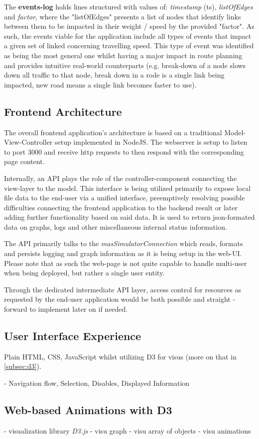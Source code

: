 The \textbf{events-log} holds lines structured with values of: \textit{timestamp} (ts), \textit{listOfEdges} and \textit{factor}, where the "listOfEdges" presents a list of nodes that identify links between them to be impacted in their weight / speed by the provided "factor".
As such, the events viable for the application include all types of events that impact a given set of linked concerning travelling speed. This type of event was identified as being the most general one whilst having a major impact in route planning and provides intuitive real-world counterparts (e.g. break-down of a node slows down all traffic to that node, break down in a rode is a single link being impacted, new road means a single link becomes faster to use).


\subsection{Frontend Architecture}\label{subsec:frontendArchitecture}

The overall frontend application's architecture is based on a traditional Model-View-Controller setup implemented in NodeJS. The webserver is setup to listen to port 3000 and receive http requests to then respond with the corresponding page content.

Internally, an API plays the role of the controller-component connecting the view-layer to the model. This interface is being utilized primarily to expose local file data to the end-user via a unified interface, preemptively resolving possible difficulties connecting the frontend application to the backend result or later adding further functionality based on said data. It is used to return json-formated data on graphs, logs and other miscellaneous internal status information.

The API primarily talks to the \textit{masSimulatorConnection} which reads, formats and persists logging and graph information as it is being setup in the web-UI.
Please note that as such the web-page is not quite capable to handle multi-user when being deployed, but rather a single user entity.

Through the dedicated intermediate API layer, access control for resources as requested by the end-user application would be both possible and straight -forward to implement later on if needed.


\subsection{User Interface Experience}

Plain HTML, CSS, JavaScript whilst utilizing D3 for visus (more on that in \autoref{subsec:d3}).

- Navigation flow, Selection, Disables, Displayed Information


\subsection{Web-based Animations with D3}\label{subsec:d3}

- visualization library \textit{D3.js} \cite{bostock2012d3}
  - visu graph
  - visu array of objects
  - visu animations
